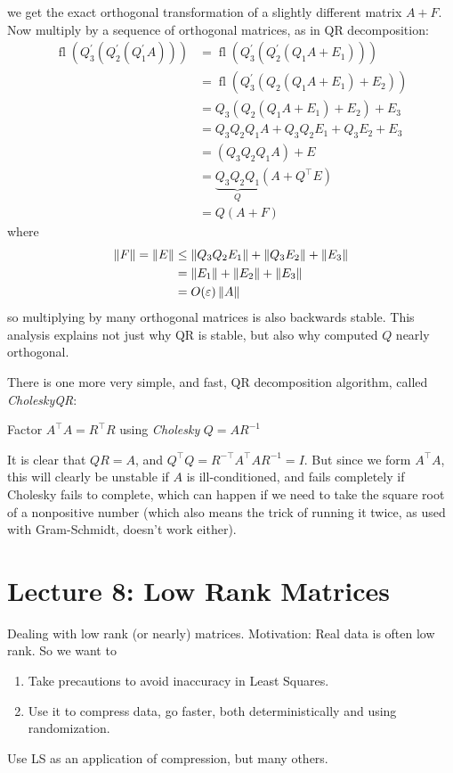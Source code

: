 \documentclass[11pt]{article}
\numberwithin{equation}{section}
\begin{document}
we get the exact orthogonal transformation of a slightly different matrix $A+F$. Now multiply by a sequence of orthogonal matrices, as in QR decomposition: \begin{align*}
    \operatorname{fl}\left( Q^\prime_3 \left( Q^\prime_2 \left( Q^\prime_1 A \right) \right) \right) &= 
    \operatorname{fl}\left( Q^\prime_3 \left( Q^\prime_2 \left( Q_1 A + E_1 \right) \right) \right) \\
    &= \operatorname{fl}\left( Q^\prime_3 \left( Q_2 \left( Q_1 A + E_1 \right) + E_2 \right) \right) \\
    &= Q_3 \left( Q_2 \left( Q_1 A + E_1 \right) + E_2 \right) + E_3 \\
    &= Q_{3} Q_{2} Q_{1} A+Q_{3} Q_{2} E_{1}+Q_{3} E_{2}+E_{3} \\
    &= \left(Q_{3} Q_{2} Q_{1} A\right)+E \\
    &= \underbrace{Q_{3} Q_{2} Q_{1}}_{Q} \left(A+Q^{\top} E\right) \\
    &= Q(A+F)
\end{align*}
where \begin{align*}
    \left\| F \right\| = \left\| E \right\| &\leq \left\| Q_{3} Q_{2} E_{1} \right\| + \left\| Q_{3} E_{2} \right\| + \left\| E_{3} \right\| \\
    &= \left\| E_{1} \right\|  + \left\| E_{2} \right\|  + \left\| E_{3} \right\| \\ 
    &= O(\varepsilon) \left\| A \right\|
\end{align*}
so multiplying by many orthogonal matrices is also backwards stable. This analysis explains not just why QR is stable, 
but also why computed $Q$ nearly orthogonal.

There is one more very simple, and fast, QR decomposition algorithm, called \textit{CholeskyQR}: \begin{algorithmfrm}[CholeskyQR]
    \begin{algorithmic}[1]
        \State Factor $A^\top A = R^\top R$ using \textit{Cholesky}
        \State $Q=AR^{-1}$
    \end{algorithmic}
\end{algorithmfrm}
It is clear that $QR = A$, and $Q^\top Q = R^{-\top}A^\top AR^{-1} = I$. But since we form $A^\top A$, this will clearly be unstable if $A$ is ill-conditioned, 
and fails completely if Cholesky fails to complete, which can happen if we need to take the square root of a nonpositive number 
(which also means the trick of running it twice, as used with Gram-Schmidt, doesn't work either).

\newpage
\section{Lecture 8: Low Rank Matrices}
Dealing with low rank (or nearly) matrices. Motivation: Real data is often low rank. So we want to
\begin{enumerate}
    \item Take precautions to avoid inaccuracy in Least Squares.
    \item Use it to compress data, go faster, both deterministically and using randomization.
\end{enumerate}
Use LS as an application of compression, but many others. 
\end{document}
